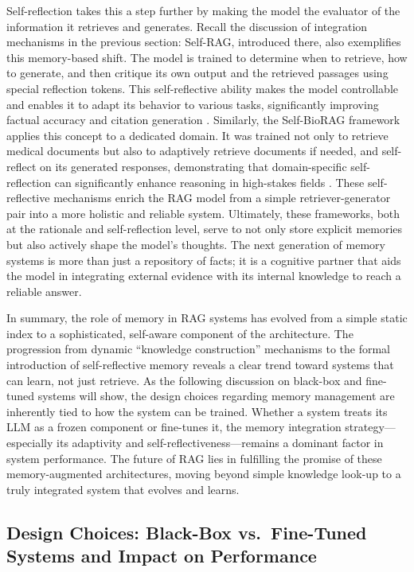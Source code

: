 \documentclass[11pt]{article}
\begin{document}
Self-reflection takes this a step further by making the model the evaluator of the information it retrieves and generates. Recall the discussion of integration mechanisms in the previous section: Self-RAG, introduced there, also exemplifies this memory-based shift. The model is trained to determine when to retrieve, how to generate, and then critique its own output and the retrieved passages using special reflection tokens. This self-reflective ability makes the model controllable and enables it to adapt its behavior to various tasks, significantly improving factual accuracy and citation generation \cite{ref41}. Similarly, the Self-BioRAG framework applies this concept to a dedicated domain. It was trained not only to retrieve medical documents but also to adaptively retrieve documents if needed, and self-reflect on its generated responses, demonstrating that domain-specific self-reflection can significantly enhance reasoning in high-stakes fields \cite{ref65}. These self-reflective mechanisms enrich the RAG model from a simple retriever-generator pair into a more holistic and reliable system. Ultimately, these frameworks, both at the rationale and self-reflection level, serve to not only store explicit memories but also actively shape the model's thoughts. The next generation of memory systems is more than just a repository of facts; it is a cognitive partner that aids the model in integrating external evidence with its internal knowledge to reach a reliable answer.

In summary, the role of memory in RAG systems has evolved from a simple static index to a sophisticated, self-aware component of the architecture. The progression from dynamic ``knowledge construction'' mechanisms \cite{ref36} to the formal introduction of self-reflective memory \cite{ref41} reveals a clear trend toward systems that can learn, not just retrieve. As the following discussion on black-box and fine-tuned systems will show, the design choices regarding memory management are inherently tied to how the system can be trained. Whether a system treats its LLM as a frozen component or fine-tunes it, the memory integration strategy---especially its adaptivity and self-reflectiveness---remains a dominant factor in system performance. The future of RAG lies in fulfilling the promise of these memory-augmented architectures, moving beyond simple knowledge look-up to a truly integrated system that evolves and learns.

\subsection{Design Choices: Black-Box vs.~Fine-Tuned Systems and Impact on Performance}
\end{document}
